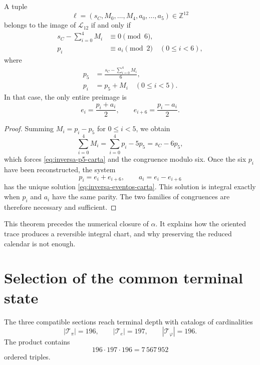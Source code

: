 \begin{theorem}
\label{thm:inversion-carta-integral-156}
A tuple
\[
 \ell=(s_C,M_0,\ldots,M_4,a_0,\ldots,a_5)\in\mathbb Z^{12}
\]
belongs to the image of \(\mathcal L_{12}\) if and only if
\begin{align}
 s_C-\sum_{i=0}^{4}M_i&\equiv0\pmod6,
 \label{eq:congruencia-seis-carta}\\
 p_i&\equiv a_i\pmod2
 \quad(0\leq i<6),
 \label{eq:congruencia-paridad-carta}
\end{align}
where
\begin{align}
 p_5&=\frac{s_C-\sum_{i=0}^{4}M_i}{6},
 \label{eq:inversa-p5-carta}\\
 p_i&=p_5+M_i\quad(0\leq i<5).
 \label{eq:inversa-pi-carta}
\end{align}
In that case, the only entire preimage is
\begin{equation}
 e_i=\frac{p_i+a_i}{2},
 \qquad
 e_{i+6}=\frac{p_i-a_i}{2}.
 \label{eq:inversa-eventos-carta}
\end{equation}
\end{theorem}

\begin{proof}
Summing \(M_i=p_i-p_5\) for \(0\leq i<5\), we obtain
\[
 \sum_{i=0}^{4}M_i
 =\sum_{i=0}^{4}p_i-5p_5
 =s_C-6p_5,
\]
which forces \eqref{eq:inversa-p5-carta} and the congruence modulo six.
Once the six \(p_i\) have been reconstructed, the system
\[
 p_i=e_i+e_{i+6},
 \qquad a_i=e_i-e_{i+6}
\]
has the unique solution \eqref{eq:inversa-eventos-carta}. This solution is
integral exactly when \(p_i\) and \(a_i\) have the same parity.
The two families of congruences are therefore necessary and sufficient.
\end{proof}

This theorem precedes the numerical closure of \(\alpha\). It explains how the
oriented trace produces a reversible integral chart, and why preserving
the reduced calendar is not enough.

\section{Selection of the common terminal state}

The three compatible sections reach terminal depth with catalogs
of cardinalities
\[
 |\mathcal T_\pi|=196,
 \qquad
 |\mathcal T_e|=197,
 \qquad
 |\mathcal T_\varphi|=196.
\]
The product contains
\begin{equation}
 196\cdot197\cdot196=7\,567\,952
 \label{eq:cardinal-producto-terminal}
\end{equation}
ordered triples.

